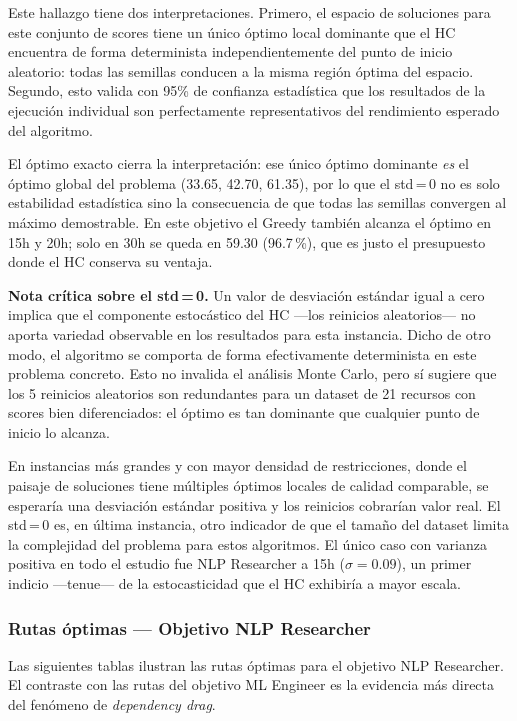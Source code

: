 \documentclass[11pt, a4paper]{article}
\begin{document}
Este hallazgo tiene dos interpretaciones. Primero, el espacio de soluciones para este conjunto de scores tiene un único óptimo local dominante que el HC encuentra de forma determinista independientemente del punto de inicio aleatorio: todas las semillas conducen a la misma región óptima del espacio. Segundo, esto valida con 95\% de confianza estadística que los resultados de la ejecución individual son perfectamente representativos del rendimiento esperado del algoritmo.

El óptimo exacto cierra la interpretación: ese único óptimo dominante \emph{es} el óptimo global del problema (33.65, 42.70, 61.35), por lo que el std\,=\,0 no es solo estabilidad estadística sino la consecuencia de que todas las semillas convergen al máximo demostrable. En este objetivo el Greedy también alcanza el óptimo en 15h y 20h; solo en 30h se queda en 59.30 (96.7\,\%), que es justo el presupuesto donde el HC conserva su ventaja.

\begin{notebox}
\textbf{Nota crítica sobre el std\,=\,0.} Un valor de desviación estándar
igual a cero implica que el componente estocástico del HC —los reinicios
aleatorios— no aporta variedad observable en los resultados para esta
instancia. Dicho de otro modo, el algoritmo se comporta de forma
efectivamente determinista en este problema concreto. Esto no invalida el
análisis Monte Carlo, pero sí sugiere que los 5 reinicios aleatorios son
redundantes para un dataset de 21 recursos con scores bien diferenciados:
el óptimo es tan dominante que cualquier punto de inicio lo alcanza.

En instancias más grandes y con mayor densidad de restricciones, donde
el paisaje de soluciones tiene múltiples óptimos locales de calidad
comparable, se esperaría una desviación estándar positiva y los reinicios
cobrarían valor real. El std\,=\,0 es, en última instancia, otro indicador
de que el tamaño del dataset limita la complejidad del problema para estos
algoritmos. El único caso con varianza positiva en todo el estudio fue NLP
Researcher a 15h ($\sigma = 0.09$), un primer indicio —tenue— de la
estocasticidad que el HC exhibiría a mayor escala.
\end{notebox}


\subsubsection*{Rutas óptimas — Objetivo NLP Researcher}

Las siguientes tablas ilustran las rutas óptimas para el objetivo NLP
Researcher. El contraste con las rutas del objetivo ML Engineer es la
evidencia más directa del fenómeno de \emph{dependency drag}.
\end{document}
